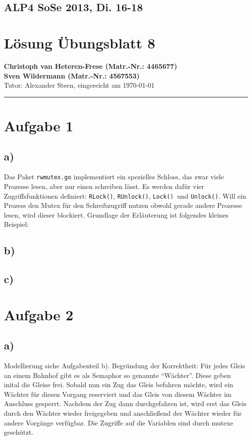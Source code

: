 \documentclass[11pt,a4paper,DIV=10,]{scrartcl}
\begin{document}
\subsection*{ALP4 SoSe 2013, Di. 16-18}
\section*{Lösung Übungsblatt 8}
\textbf{Christoph van Heteren-Frese (Matr.-Nr.: 4465677)} \\ \textbf{Sven Wildermann (Matr.-Nr.: 4567553)}\\
Tutor: Alexander Steen, eingereicht am \today\\
\hrule
\section*{Aufgabe 1}
\subsection*{a)}
Das Paket \texttt{rwmutex.go} implementiert ein spezielles Schloss, das zwar viele Prozesse lesen, aber nur einen schreiben lässt. Es werden dafür vier Zugriffsfunktionen definiert: \texttt{RLock()}, \texttt{RUnlock()}, \texttt{Lock() }und \texttt{Unlock()}. Will ein Prozess den Mutex für den Schreibzugriff nutzen obwohl gerade andere Prozesse lesen, wird dieser blockiert.
Grundlage der Erläuterung ist folgendes kleines Beispiel:

\subsection*{b)}
\subsection*{c)}
\section*{Aufgabe 2}
\subsection*{a)}
Modellierung siehe Aufgabenteil b). Begründung der Korrektheit: Für jedes Gleis an einem Bahnhof gibt es als Semaphor so genannte ``Wächter''. Diese geben inital die Gleise frei. Sobald nun ein Zug das Gleis befahren möchte, wird ein Wächter für diesen Vorgang reserviert und das Gleis von diesem Wächter im Anschluss gesperrt. Nachdem der Zug dann durchgefahren ist, wird erst das Gleis durch den Wächter wieder freigegeben und anschließend der Wächter wieder für andere Vorgänge verfügbar. Die Zugriffe auf die Variablen sind durch mutexe geschützt. 
\end{document}

